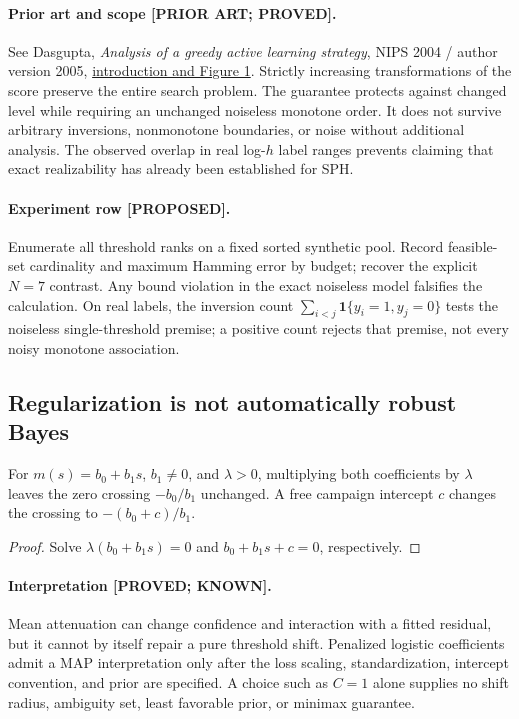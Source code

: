 \paragraph{Prior art and scope [PRIOR ART; PROVED].}
See Dasgupta, \emph{Analysis of a greedy active learning strategy},
NIPS 2004 / author version 2005,
\href{https://cseweb.ucsd.edu/~dasgupta/papers/greedy.pdf}{introduction and Figure 1}.
Strictly increasing transformations of the score preserve the entire
search problem.  The guarantee protects against changed level while
requiring an unchanged noiseless monotone order.  It does not survive
arbitrary inversions, nonmonotone boundaries, or noise without additional
analysis.  The observed overlap in real log-$h$ label ranges prevents
claiming that exact realizability has already been established for SPH.

\paragraph{Experiment row [PROPOSED].}
Enumerate all threshold ranks on a fixed sorted synthetic pool.  Record
feasible-set cardinality and maximum Hamming error by budget; recover
the explicit $N=7$ contrast.  Any bound violation in the exact noiseless
model falsifies the calculation.  On real labels, the inversion count
$\sum_{i<j}\mathbf{1}\{y_i=1,y_j=0\}$ tests the noiseless single-threshold
premise; a positive count rejects that premise, not every noisy monotone
association.

\subsection{Regularization is not automatically robust Bayes}

\begin{proposition}
For $m(s)=b_0+b_1s$, $b_1\ne0$, and $\lambda>0$, multiplying both
coefficients by $\lambda$ leaves the zero crossing $-b_0/b_1$ unchanged.
A free campaign intercept $c$ changes the crossing to
$-(b_0+c)/b_1$.
\end{proposition}
\begin{proof}
Solve $\lambda(b_0+b_1s)=0$ and $b_0+b_1s+c=0$, respectively.
\end{proof}

\paragraph{Interpretation [PROVED; KNOWN].}
Mean attenuation can change confidence and interaction with a fitted
residual, but it cannot by itself repair a pure threshold shift.
Penalized logistic coefficients admit a MAP interpretation only after
the loss scaling, standardization, intercept convention, and prior are
specified.  A choice such as $C=1$ alone supplies no shift radius,
ambiguity set, least favorable prior, or minimax guarantee.

